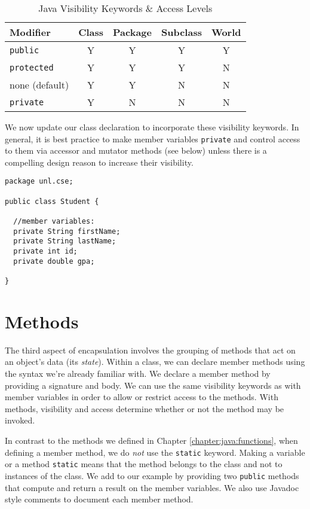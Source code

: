 \begin{table}[h]
\centering
\begin{tabular}{|l|c|c|c|c|}
\hline
Modifier & Class & Package & Subclass & World \\
\hline\hline
\texttt{public} & Y & Y & Y & Y \\
\hline
\texttt{protected} & Y & Y & Y & N \\
\hline
none (default)        & Y & Y & N & N \\
\hline
\texttt{private} & Y & N & N & N \\
\hline
\end{tabular}
\caption{Java Visibility Keywords \& Access Levels}
\label{table:javaVisibilityKeywords}
\end{table}

We now update our class declaration to incorporate these visibility
keywords.  In general, it is best practice to make member variables 
\texttt{private} and control access to them via accessor and
mutator methods (see below) unless there is a compelling design
reason to increase their visibility.  

\begin{verbatim}
package unl.cse;

public class Student {

  //member variables:
  private String firstName;
  private String lastName;
  private int id;
  private double gpa;

}
\end{verbatim}

\section{Methods}

The third aspect of encapsulation involves the grouping of methods that
act on an object's data (its \emph{state}).  Within a class, we 
can declare member methods
using the syntax we're already familiar with.  We declare a member
method by providing a signature and body.  We can use the same visibility
keywords as with member variables in order to allow or restrict access
to the methods.  With methods, visibility and access determine whether 
or not the method may be invoked.

In contrast to the methods we defined in Chapter 
\ref{chapter:java:functions}, when defining a member method, we
do \emph{not} use the \texttt{static} keyword.  Making
a variable or a method \texttt{static} means that the 
method belongs to the class and not to instances of the class.  
We add to our example by providing two \texttt{public}
methods that compute and return a result on the member variables.  
We also use Javadoc style comments to document each member method.

